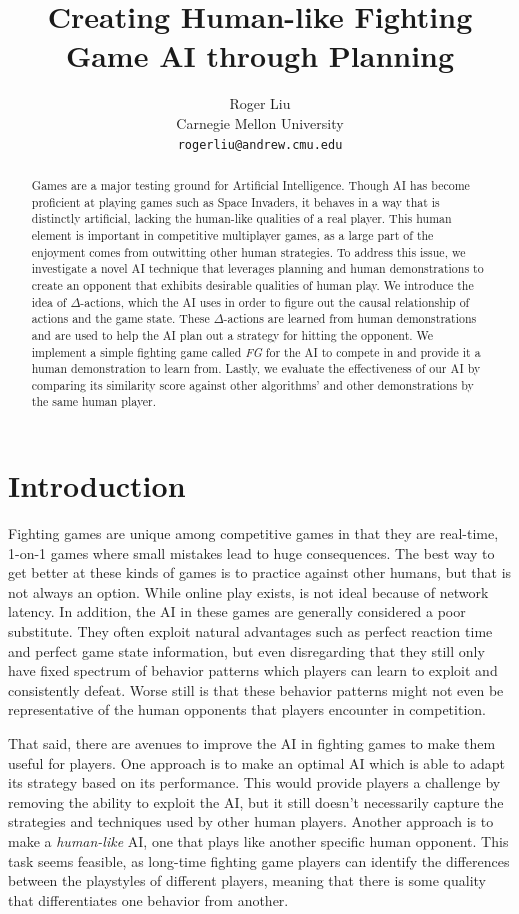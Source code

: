 \documentclass{article}
\title{Creating Human-like Fighting Game AI through Planning}
\author{
  Roger Liu \\
  Carnegie Mellon University \\
  \texttt{rogerliu@andrew.cmu.edu} \\
}
\begin{document}
\maketitle

\begin{abstract}
Games are a major testing ground for Artificial Intelligence. Though AI has become proficient at playing games such as Space Invaders, it behaves in a way that is distinctly artificial, lacking the human-like qualities of a real player. This human element is important in competitive multiplayer games, as a large part of the enjoyment comes from outwitting other human strategies. To address this issue, we investigate a novel AI technique that leverages planning and human demonstrations to create an opponent that exhibits desirable qualities of human play. We introduce the idea of $\Delta$-actions, which the AI uses in order to figure out the causal relationship of actions and the game state. These $\Delta$-actions are learned from human demonstrations and are used to help the AI plan out a strategy for hitting the opponent. We implement a simple fighting game called \textit{FG} for the AI to compete in and provide it a human demonstration to learn from. Lastly, we evaluate the effectiveness of our AI by comparing its similarity score against other algorithms' and other demonstrations by the same human player.
\end{abstract}




\section{Introduction}
Fighting games are unique among competitive games in that they are real-time, 1-on-1 games where small mistakes lead to huge consequences. The best way to get better at these kinds of games is to practice against other humans, but that is not always an option. While online play exists, is not ideal because of network latency. In addition, the AI in these games are generally considered a poor substitute. They often exploit natural advantages such as perfect reaction time and perfect game state information, but even disregarding that they still only have fixed spectrum of behavior patterns which players can learn to exploit and consistently defeat. Worse still is that these behavior patterns might not even be representative of the human opponents that players encounter in competition.

That said, there are avenues to improve the AI in fighting games to make them useful for players. One approach is to make an optimal AI which is able to adapt its strategy based on its performance. This would provide players a challenge by removing the ability to exploit the AI, but it still doesn't necessarily capture the strategies and techniques used by other human players. Another approach is to make a \textit{human-like} AI, one that plays like another specific human opponent. This task seems feasible, as long-time fighting game players can identify the differences between the playstyles of different players, meaning that there is some quality that differentiates one behavior from another.
\end{document}
